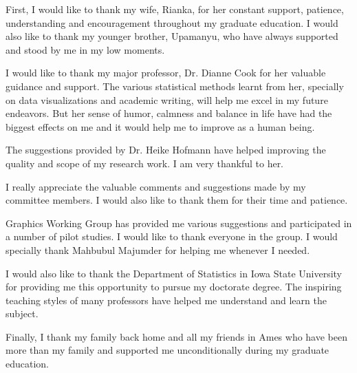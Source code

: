 
First, I would like to thank my wife, Rianka, for her constant support, patience, understanding and encouragement throughout my graduate education. I would also like to thank my younger brother, Upamanyu, who have always supported and stood by me in my low moments.

I would like to thank my major professor, Dr. Dianne Cook for her valuable guidance and support. The various statistical methods learnt from her, specially on data visualizations and academic writing, will help me excel in my future endeavors. But her sense of humor, calmness and balance in life have had the biggest effects on me and it would help me to improve as a human being.

The suggestions provided by Dr. Heike Hofmann have helped improving the quality and scope of my research work. I am very thankful to her.

I really appreciate the valuable comments and suggestions made by my committee members. I would also like to thank them for their time and patience. 

Graphics Working Group has provided me various suggestions and participated in a number of pilot studies. I would like to thank everyone in the group. I would specially thank Mahbubul Majumder for helping me whenever I needed.

I would also like to thank the Department of Statistics in Iowa State University for providing me this opportunity to pursue my doctorate degree. The inspiring teaching styles of many professors have helped me understand and learn the subject. 

Finally, I thank my family back home and all my friends in Ames who have been more than my family and supported me unconditionally during my graduate education.
